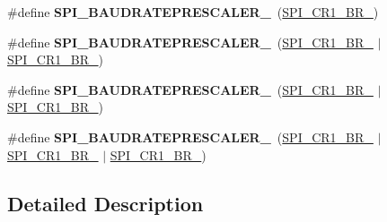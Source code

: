 \begin{DoxyCompactItemize}
\#define {\bfseries S\+P\+I\+\_\+\+B\+A\+U\+D\+R\+A\+T\+E\+P\+R\+E\+S\+C\+A\+L\+E\+R\+\_}~(\mbox{\hyperlink{group___peripheral___registers___bits___definition_ga28b823d564e9d90150bcc6744b4ed622}{S\+P\+I\+\_\+\+C\+R1\+\_\+\+B\+R\+\_}})
\item 
\mbox{\label{group___s_p_i___baud_rate___prescaler_ga64129361cbd23907d14144befe2209f4}} 
\#define {\bfseries S\+P\+I\+\_\+\+B\+A\+U\+D\+R\+A\+T\+E\+P\+R\+E\+S\+C\+A\+L\+E\+R\+\_}~(\mbox{\hyperlink{group___peripheral___registers___bits___definition_ga28b823d564e9d90150bcc6744b4ed622}{S\+P\+I\+\_\+\+C\+R1\+\_\+\+B\+R\+\_}} $\vert$ \mbox{\hyperlink{group___peripheral___registers___bits___definition_gaa364b123cf797044094cc229330ce321}{S\+P\+I\+\_\+\+C\+R1\+\_\+\+B\+R\+\_}})
\item 
\mbox{\label{group___s_p_i___baud_rate___prescaler_ga939117a1ff97fbf4f1340cbb3141fb29}} 
\#define {\bfseries S\+P\+I\+\_\+\+B\+A\+U\+D\+R\+A\+T\+E\+P\+R\+E\+S\+C\+A\+L\+E\+R\+\_}~(\mbox{\hyperlink{group___peripheral___registers___bits___definition_ga28b823d564e9d90150bcc6744b4ed622}{S\+P\+I\+\_\+\+C\+R1\+\_\+\+B\+R\+\_}} $\vert$ \mbox{\hyperlink{group___peripheral___registers___bits___definition_ga45e93d18c8966964ed1926d5ca87ef46}{S\+P\+I\+\_\+\+C\+R1\+\_\+\+B\+R\+\_}})
\item 
\mbox{\label{group___s_p_i___baud_rate___prescaler_ga4debd0953aeeb470eae28a42aa8289c2}} 
\#define {\bfseries S\+P\+I\+\_\+\+B\+A\+U\+D\+R\+A\+T\+E\+P\+R\+E\+S\+C\+A\+L\+E\+R\+\_}~(\mbox{\hyperlink{group___peripheral___registers___bits___definition_ga28b823d564e9d90150bcc6744b4ed622}{S\+P\+I\+\_\+\+C\+R1\+\_\+\+B\+R\+\_}} $\vert$ \mbox{\hyperlink{group___peripheral___registers___bits___definition_ga45e93d18c8966964ed1926d5ca87ef46}{S\+P\+I\+\_\+\+C\+R1\+\_\+\+B\+R\+\_}} $\vert$ \mbox{\hyperlink{group___peripheral___registers___bits___definition_gaa364b123cf797044094cc229330ce321}{S\+P\+I\+\_\+\+C\+R1\+\_\+\+B\+R\+\_}})
\end{DoxyCompactItemize}


\subsection{Detailed Description}
